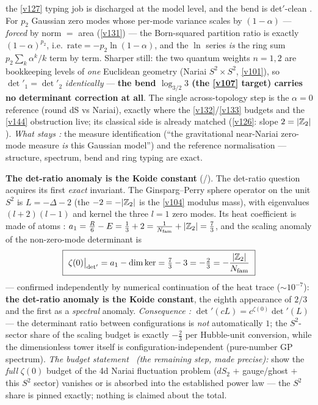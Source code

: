 the \vref{v127} typing job is discharged at the model level, and the bend is det$'$-clean \mE. For
$p_2$ Gaussian zero modes whose per-mode variance scales by $(1-\alpha)$ --- \emph{forced} by
norm $=$ area (\vref{v131}) --- the Born-squared partition ratio is exactly $(1-\alpha)^{p_2}$, i.e.\
$\mathrm{rate}=-p_2\ln(1-\alpha)$, and the $\ln$ series \emph{is} the ring sum $p_2\sum_k\alpha^k/k$
term by term. Sharper still: the two quantum weights $n=1,2$ are bookkeeping levels of \emph{one}
Euclidean geometry (Nariai $S^2{\times}S^2$, \vref{v101}), so $\det'_1=\det'_2$ \emph{identically} ---
\textbf{the bend $\log_{3/2}3$ (the \vref{v107} target) carries no determinant correction at all}. The
single across-topology step is the $\alpha=0$ reference (round dS vs Nariai), exactly where the
\vref{v132}/\vref{v133} budgets and the \vref{v144} obstruction live; its classical side is already
matched (\vref{v126}: slope $2=|\mathbb{Z}_2|$). \emph{What stays \mC:} the measure identification
(``the gravitational near-Nariai zero-mode measure \emph{is} this Gaussian model'') and the reference
normalisation --- structure, spectrum, bend and ring typing are exact.


\par\smallskip\noindent\textbf{The det-ratio anomaly is the Koide constant} (\mE/\mC).
The det-ratio question acquires its first \emph{exact} invariant. The Ginsparg--Perry sphere operator
on the unit $S^2$ is $L=-\Delta-2$ (the $-2=-|\mathbb{Z}_2|$ is the \vref{v104} modulus mass), with eigenvalues
$(l{+}2)(l{-}1)$ and kernel the three $l{=}1$ zero modes. Its heat coefficient is made of atoms \mE:
$a_1=\tfrac R6-E=\tfrac13+2=\tfrac1{N_{\mathrm{fam}}}+|\mathbb{Z}_2|=\tfrac73$, and the scaling anomaly of the
non-zero-mode determinant is
\[
  \boxed{\ \zeta(0)\big|_{\det'}=a_1-\dim\ker=\tfrac73-3=-\tfrac23=-\frac{|\Z_2|}{\Nfam}\ }
\]
--- confirmed independently by numerical continuation of the heat trace ($\sim10^{-7}$): \textbf{the
det-ratio anomaly is the Koide constant}, the eighth appearance of $2/3$ and the first as a
\emph{spectral} anomaly. \emph{Consequence \mE:} $\det'(cL)=c^{\zeta(0)}\det'(L)$ --- the determinant
ratio between configurations is \emph{not} automatically $1$; the $S^2$-sector share of the scaling
budget is exactly $-\tfrac23$ per Hubble-unit conversion, while the dimensionless tower itself is
configuration-independent (pure-number GP spectrum). \emph{The budget statement \mC\ (the remaining
step, made precise):} show the \emph{full} $\zeta(0)$ budget of the 4d Nariai fluctuation problem
($dS_2$ $+$ gauge/ghost $+$ this $S^2$ sector) vanishes or is absorbed into the established power law
--- the $S^2$ share is pinned exactly; nothing is claimed about the total. 


